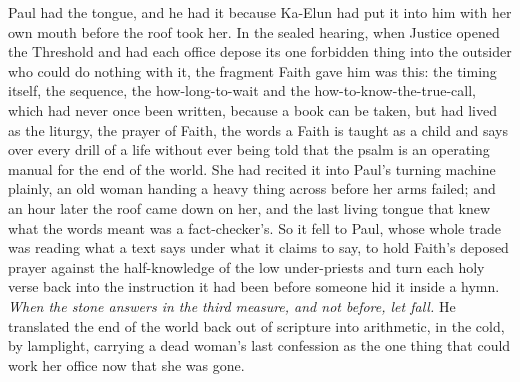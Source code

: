 Paul had the tongue, and he had it because Ka-Elun had put it into him with her own mouth before the roof took her. In the sealed hearing, when Justice opened the Threshold and had each office depose its one forbidden thing into the outsider who could do nothing with it, the fragment Faith gave him was this: the timing itself, the sequence, the how-long-to-wait and the how-to-know-the-true-call, which had never once been written, because a book can be taken, but had lived as the liturgy, the prayer of Faith, the words a Faith is taught as a child and says over every drill of a life without ever being told that the psalm is an operating manual for the end of the world. She had recited it into Paul's turning machine plainly, an old woman handing a heavy thing across before her arms failed; and an hour later the roof came down on her, and the last living tongue that knew what the words meant was a fact-checker's. So it fell to Paul, whose whole trade was reading what a text says under what it claims to say, to hold Faith's deposed prayer against the half-knowledge of the low under-priests and turn each holy verse back into the instruction it had been before someone hid it inside a hymn. \emph{When the stone answers in the third measure, and not before, let fall.} He translated the end of the world back out of scripture into arithmetic, in the cold, by lamplight, carrying a dead woman's last confession as the one thing that could work her office now that she was gone.\par


